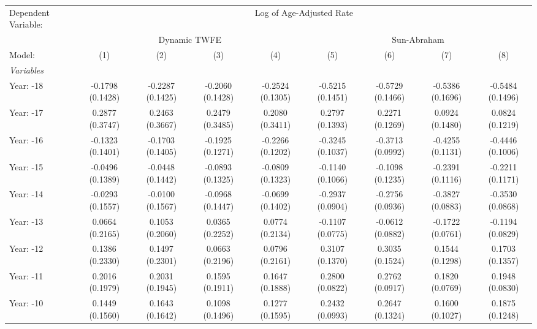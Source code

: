 
\begingroup
\centering
\tiny
\begin{tabular}{lcccccccc}
   \tabularnewline \midrule \midrule
   Dependent Variable: & \multicolumn{8}{c}{Log of Age-Adjusted Rate}\\
    & \multicolumn{4}{c}{Dynamic TWFE} & \multicolumn{4}{c}{Sun-Abraham} \\ 
   Model:                              & (1)              & (2)              & (3)              & (4)              & (5)              & (6)              & (7)              & (8)\\  
   \midrule
   \emph{Variables}\\
   Year: -18                           & -0.1798 (0.1428) & -0.2287 (0.1425) & -0.2060 (0.1428) & -0.2524 (0.1305) & -0.5215 (0.1451) & -0.5729 (0.1466) & -0.5386 (0.1696) & -0.5484 (0.1496)\\   
   Year: -17                           & 0.2877 (0.3747)  & 0.2463 (0.3667)  & 0.2479 (0.3485)  & 0.2080 (0.3411)  & 0.2797 (0.1393)  & 0.2271 (0.1269)  & 0.0924 (0.1480)  & 0.0824 (0.1219)\\   
   Year: -16                           & -0.1323 (0.1401) & -0.1703 (0.1405) & -0.1925 (0.1271) & -0.2266 (0.1202) & -0.3245 (0.1037) & -0.3713 (0.0992) & -0.4255 (0.1131) & -0.4446 (0.1006)\\   
   Year: -15                           & -0.0496 (0.1389) & -0.0448 (0.1442) & -0.0893 (0.1325) & -0.0809 (0.1323) & -0.1140 (0.1066) & -0.1098 (0.1235) & -0.2391 (0.1116) & -0.2211 (0.1171)\\   
   Year: -14                           & -0.0293 (0.1557) & -0.0100 (0.1567) & -0.0968 (0.1447) & -0.0699 (0.1402) & -0.2937 (0.0904) & -0.2756 (0.0936) & -0.3827 (0.0883) & -0.3530 (0.0868)\\   
   Year: -13                           & 0.0664 (0.2165)  & 0.1053 (0.2060)  & 0.0365 (0.2252)  & 0.0774 (0.2134)  & -0.1107 (0.0775) & -0.0612 (0.0882) & -0.1722 (0.0761) & -0.1194 (0.0829)\\   
   Year: -12                           & 0.1386 (0.2330)  & 0.1497 (0.2301)  & 0.0663 (0.2196)  & 0.0796 (0.2161)  & 0.3107 (0.1370)  & 0.3035 (0.1524)  & 0.1544 (0.1298)  & 0.1703 (0.1357)\\   
   Year: -11                           & 0.2016 (0.1979)  & 0.2031 (0.1945)  & 0.1595 (0.1911)  & 0.1647 (0.1888)  & 0.2800 (0.0822)  & 0.2762 (0.0917)  & 0.1820 (0.0769)  & 0.1948 (0.0830)\\   
   Year: -10                           & 0.1449 (0.1560)  & 0.1643 (0.1642)  & 0.1098 (0.1496)  & 0.1277 (0.1595)  & 0.2432 (0.0993)  & 0.2647 (0.1324)  & 0.1600 (0.1027)  & 0.1875 (0.1248)\\   

\end{tabular}
